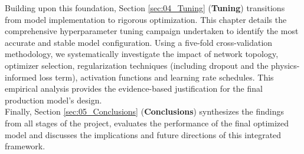 Building upon this foundation, Section \ref{sec:04_Tuning} (\textbf{Tuning}) transitions from model implementation to rigorous optimization. This chapter details the comprehensive hyperparameter tuning campaign undertaken to identify the most accurate and stable model configuration. Using a five-fold cross-validation methodology, we systematically investigate the impact of network topology, optimizer selection, regularization techniques (including dropout and the physics-informed loss term), activation functions and learning rate schedules. This empirical analysis provides the evidence-based justification for the final production model's design.\\

Finally, Section \ref{sec:05_Conclusions} (\textbf{Conclusions}) synthesizes the findings from all stages of the project, evaluates the performance of the final optimized model and discusses the implications and future directions of this integrated framework.\\